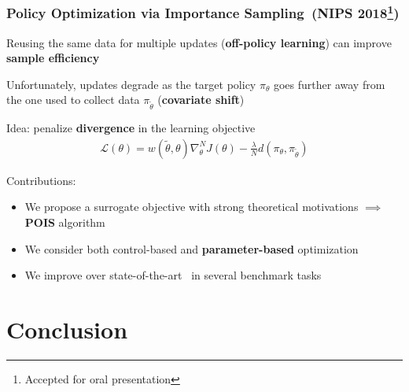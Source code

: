 \documentclass{beamer}
\begin{document}
\begin{frame}
\frametitle{Policy Optimization via Importance Sampling~\small(NIPS 2018\footnote{Accepted for oral presentation})}
Reusing the same data for multiple updates (\textbf{off-policy learning}) can improve \textbf{sample efficiency}

\vfill

Unfortunately, updates degrade as the target policy $\pi_{\theta}$ goes further away from the one used to collect data $\pi_{\tilde{\theta}}$ (\textbf{covariate shift})

\vfill

Idea: penalize \textbf{divergence} in the learning objective
\begin{align*}
	\mathcal{L}(\theta) = w(\widetilde{\theta},\theta)\nabla_{\theta}^NJ(\theta) - \frac{\lambda}{N}d(\pi_{\theta}, \pi_{\tilde{\theta}})
\end{align*}

\colorbox{cyan!10}{
	\begin{minipage}{\textwidth}
Contributions:
\begin{itemize}
	\item We propose a surrogate objective with strong theoretical motivations $\implies$ \textbf{POIS} algorithm
	\item We consider both control-based and \textbf{parameter-based} optimization
	\item We improve over state-of-the-art~\cite{schulman2015trust} in several benchmark tasks
\end{itemize}
\end{minipage}
}
\end{frame}

\section{Conclusion}
\end{document}
